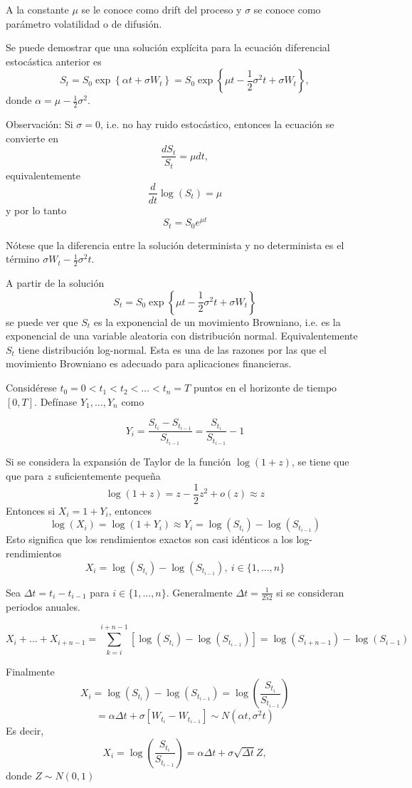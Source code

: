 \documentclass[12pt,reqno,letter]{article}
\begin{document}
	A la constante $\mu$ se le conoce como drift del proceso y $\sigma$ se conoce  como parámetro volatilidad o de difusión.
	
	Se puede demostrar que una solución explícita para la ecuación diferencial estocástica anterior es
	$$S_t =  S_0 \exp\left\{\alpha t + \sigma W_t\right\} =  S_0 \exp\left\{\mu t -\frac{1}{2}\sigma^2t + \sigma W_t\right\},$$
	donde $\alpha = \mu-\frac{1}{2}\sigma^2$.
	
	Observación:
	Si $\sigma = 0$, i.e. no hay ruido estocástico, entonces la ecuación se convierte en
	$$\frac{dS_t}{S_t} = \mu dt,$$
	equivalentemente
	$$\frac{d}{dt}\log(S_t) = \mu$$
	y por lo tanto
	$$S_t = S_0 e^{\mu t}$$
	
	Nótese que la diferencia entre la solución determinista y no determinista es el término $\sigma W_t-\frac{1}{2}\sigma^2t$.
	
	A partir de la solución $$S_t = S_0 \exp\left\{\mu t -\frac{1}{2}\sigma^2t + \sigma W_t\right\}$$
	se puede ver que $S_t$ es la exponencial de un movimiento Browniano, i.e. es la exponencial de una variable aleatoria con distribución normal. Equivalentemente $S_t$ tiene distribución log-normal. Esta es una de las razones por las que el movimiento Browniano es adecuado para aplicaciones financieras.
	
	Considérese $t_0=0 < t_1 < t_2 <\ldots<t_n=T$ puntos en el horizonte de tiempo $[0,T]$. Defínase $Y_1,\ldots,Y_n$ como
	
	$$Y_i = \frac{S_{t_i}-S_{t_{i-1}}}{S_{t_{i-1}}}=\frac{S_{t_i}}{S_{t_{i-1}}}-1$$
	
	Si se considera la expansión de Taylor de la función $\log(1+z)$, se tiene que que para $z$ suficientemente pequeña
	$$\log(1+z) = z-\frac{1}{2}z^2 + o(z) \approx z$$
	Entonces si $X_i = 1+ Y_i$, entonces
	$$\log(X_i) = \log(1+Y_i) \approx Y_i = \log(S_{t_i})-\log(S_{t_{i-1}})$$
	Esto significa que los rendimientos exactos son casi idénticos a los log-rendimientos
	$$X_i = \log(S_{t_i})-\log(S_{t_{i-1}}),\ i\in\{1,\ldots,n\}$$
	
	Sea $\Delta t = t_i - t_{i-1}$ para $i\in\{1,\ldots,n\}$. Generalmente $\Delta t = \frac{1}{252}$ si se consideran periodos anuales.
	
	$$X_i + \ldots + X_{i+n-1}=\sum_{k=i}^{i+n-1}[\log(S_{t_i})-\log(S_{t_{i-1}})]=\log(S_{i+n-1})-\log(S_{i-1})$$
	
	Finalmente
	$$X_i = \log(S_{t_i})-\log(S_{t_{i-1}}) = \log\left(\frac{S_{t_i}}{S_{t_{i-1}}}\right)$$
	$$=\alpha \Delta t + \sigma[W_{t_i}-W_{t_{i-1}}]\sim N(\alpha t , \sigma^2 t)$$
	Es decir,
	$$X_i = \log\left(\frac{S_{t_i}}{S_{t_{i-1}}}\right) = \alpha \Delta t + \sigma\sqrt{\Delta t}Z,$$
	donde $Z\sim N(0,1)$
	
\end{document}
